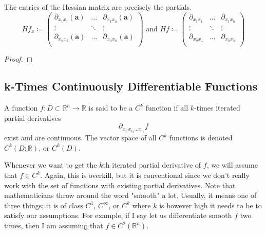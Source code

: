   \begin{theorem}
    The entries of the Hessian matrix are precisely the partials. 
    \begin{equation}
      H f_{x} \coloneqq \begin{pmatrix} 
        \partial_{x_1 x_1} (\mathbf{a}) & \ldots & \partial_{x_1 x_n} (\mathbf{a}) \\
        \vdots & \ddots & \vdots \\
        \partial_{x_n x_1} (\mathbf{a}) & \ldots & \partial_{x_n x_n} (\mathbf{a}) \\
        \end{pmatrix} \text{ and } H f \coloneqq \begin{pmatrix} 
        \partial_{x_1 x_1} & \ldots & \partial_{x_1 x_n} \\
        \vdots & \ddots & \vdots \\
        \partial_{x_n x_1} & \ldots & \partial_{x_n x_n} \\
      \end{pmatrix}
    \end{equation}
  \end{theorem}
  \begin{proof}
    
  \end{proof}

\subsection{k-Times Continuously Differentiable Functions}

  \begin{definition}[$C^k$ Functions]
    A function $f: D \subset \mathbb{R}^n \longrightarrow \mathbb{R}$ is said to be a $C^k$ function if all $k$-times iterated partial derivatives 
    \begin{equation}
      \partial_{x_{i_1} x_{i_2} \ldots x_{i_k}} f
    \end{equation}
    exist and are continuous. The vector space of all $C^k$ functions is denoted $C^k (D; \mathbb{R})$, or $C^k(D)$. 
  \end{definition}

  Whenever we want to get the $k$th iterated partial derivative of $f$, we will assume that $f \in C^k$. Again, this is overkill, but it is conventional since we don't really work with the set of functions with existing partial derivatives. Note that mathematicians throw around the word "smooth" a lot. Usually, it means one of three things: it is of class $C^1$, $C^\infty$, or $C^k$ where $k$ is however high it needs to be to satisfy our assumptions. For example, if I say let us differentiate smooth $f$ two times, then I am assuming that $f \in C^2 (\mathbb{R}^n)$. 

